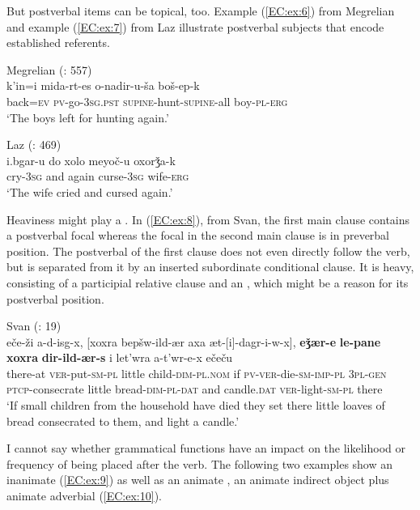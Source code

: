 \documentclass[output=paper,colorlinks,citecolor=brown,draftmode]{langscibook}
\begin{document}
But postverbal items can be topical, too. Example (\ref{EC:ex:6}) from Megrelian and example (\ref{EC:ex:7}) from Laz illustrate postverbal subjects that encode established referents.

\ea\label{EC:ex:6}
Megrelian (\citealt{rostovtsev-popiel_megrelian_2021}: 557) \\
\gll k'in=i mida-rt-es o-nadir-u-ša boš-ep-k \\
back\textsc{=ev} \textsc{pv-}go\textsc{-3sg.pst} \textsc{supine-}hunt\textsc{-supine}-all boy\textsc{-pl-erg} \\
\glt `The boys left for hunting again.'
\z

\ea\label{EC:ex:7}
Laz (\citealt{holisky_laz_1991}: 469) \\
\gll i.bgar-u do xolo meyoč-u oxorǯa-k \\
cry\textsc{-3sg} and again curse\textsc{-3sg} wife\textsc{-erg} \\
\glt `The wife cried and cursed again.'
\z

Heaviness might play a . In (\ref{EC:ex:8}), from Svan, the first main clause contains a postverbal focal  whereas the focal  in the second main clause is in preverbal position. The postverbal  of the first clause does not even directly follow the verb, but is separated from it by an inserted subordinate conditional clause. It is heavy, consisting of a participial relative clause and an , which might be a reason for its postverbal position.

\ea\label{EC:ex:8}
Svan (\citealt{tuite_short_1998}: 19) \\
\gll eče-ži a-d-isg-x, [xoxra bepšw-ild-ær axa æt-[i]-dagr-i-w-x], \textbf{eǯær-e} \textbf{le-pane} \textbf{xoxra} \textbf{dir-ild-ær-s} i let'wra a-t'wr-e-x ečeču \\
there-at \textsc{ver-}put\textsc{-sm-pl} little child\textsc{-dim-pl.nom} if \textsc{pv-ver-}die\textsc{-sm-imp-pl} \textsc{3pl-gen} \textsc{ptcp-}consecrate little bread\textsc{-dim-pl-dat} and candle\textsc{.dat} \textsc{ver-}light\textsc{-sm-pl} there \\
\glt `If small children from the household have died they set there little loaves of bread consecrated to them, and light a candle.'
\z

I cannot say whether grammatical functions have an impact on the likelihood or frequency of being placed after the verb. The following two examples show an inanimate  (\ref{EC:ex:9}) as well as an animate , an animate indirect object plus animate adverbial (\ref{EC:ex:10}).
\end{document}
